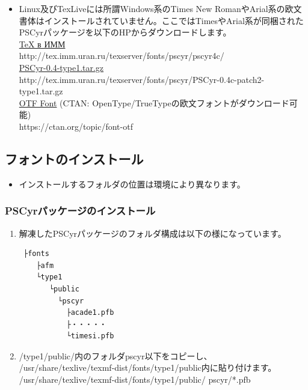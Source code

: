 \documentclass[a4paper,10pt]{ltjsarticle}
\def\colH#1{\color[HTML]{#1}}
\def\fs#1{\fontsize{#1}{#1}\selectfont }
\begin{document}
\begin{itemize} 
  \item Linux及びTexLiveには所謂Windows系のTimes New RomanやArial系の欧文書体はインストールされていません。ここではTimesやArial系が同梱されたPSCyrパッケージを以下のHPからダウンロードします。\\ 
  \href{http://tex.imm.uran.ru/texserver/fonts/pscyr/pscyr4c/}{TeX в ИММ}\\
  {\fs{11}http://tex.imm.uran.ru/texserver/fonts/pscyr/pscyr4c/}\\  
  \href{http://tex.imm.uran.ru/texserver/fonts/pscyr/PSCyr-0.4c-patch2-type1.tar.gz}{PSCyr-0.4-type1.tar.gz}\\
  {\fs{11}http://tex.imm.uran.ru/texserver/fonts/pscyr/PSCyr-0.4c-patch2-type1.tar.gz}\\
\href{https://ctan.org/topic/font-otf}{OTF Font} (CTAN: OpenType/TrueTypeの欧文フォントがダウンロード可能)\\
https://ctan.org/topic/font-otf
\end{itemize}
\vspace{-2mm}

\subsection{フォントのインストール}
\begin{itemize}
  \item インストールするフォルダの位置は環境により異なります。\vspace{-4mm}
\end{itemize}

\subsubsection{PSCyrパッケージのインストール}

\vspace{2mm}

\begin{enumerate}
  \item 解凍したPSCyrパッケージのフォルダ構成は以下の様になっています。
{\fs{10pt}
\begin{verbatim}
 ├fonts
    ├afm
    └type1
       └public
         └pscyr
           ├acade1.pfb
           ├・・・・・
           └timesi.pfb
\end{verbatim}
}

  \item /type1/public/内のフォルダpscyr以下をコピーし、\\
  /usr/share/texlive/texmf-dist/fonts/type1/public内に貼り付けます。\\
/usr/share/texlive/texmf-dist/fonts/type1/public/{\colH{800000} pscyr/*.pfb}
\end{enumerate}
\end{document}
